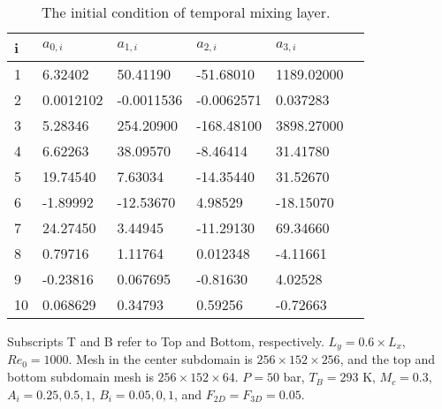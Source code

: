 {\begin{table}
    \caption{The initial condition of temporal mixing layer.}\label{TML_init_table2}
    \begin{threeparttable} 
\begin{tabular*}{0.8\textwidth}{@{} l|lllll@{}}
    \toprule
    i     & $a_{0,i}$   & $a_{1,i}$  & $a_{2,i}$   & $a_{3,i}$ \\
    \midrule
    1     & 6.32402          & 50.41190          & -51.68010       & 1189.02000  \\
    2     & 0.0012102        & -0.0011536        & -0.0062571      & 0.037283    \\
    3     & 5.28346          & 254.20900         & -168.48100      & 3898.27000  \\
    4     & 6.62263          & 38.09570          & -8.46414        & 31.41780    \\
    5     & 19.74540         & 7.63034           & -14.35440       & 31.52670    \\
    6     & -1.89992         & -12.53670         & 4.98529         & -18.15070   \\
    7     & 24.27450         & 3.44945           & -11.29130       & 69.34660    \\
    8     & 0.79716          & 1.11764           & 0.012348        & -4.11661    \\
    9     & -0.23816         & 0.067695          & -0.81630        & 4.02528     \\
    10    & 0.068629         & 0.34793           & 0.59256         & -0.72663    \\
    \bottomrule
\end{tabular*}
\begin{tablenotes}
    \footnotesize    
    \item Subscripts T and B refer to Top and Bottom, respectively. $L_y = 0.6\times L_x$,  $Re_0=1000$. Mesh in the center subdomain is $256\times 152 \times 256$, and the top and bottom subdomain mesh is $256\times 152\times 64$. $P = 50$ bar, $T_B=293$ K, $M_c = 0.3$, $A_i = 0.25, 0.5, 1$, $B_i = 0.05, 0, 1$, and $F_{2D}= F_{3D} = 0.05$.\\
  \end{tablenotes}
\end{threeparttable}
\end{table}


}
